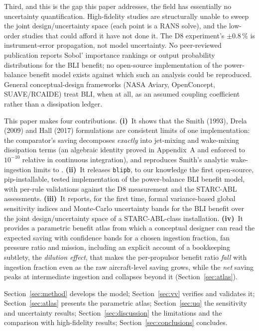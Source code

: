 \documentclass[10pt]{article}
\begin{document}
Third, and this is the gap this paper addresses, the field has
essentially no uncertainty quantification. High-fidelity studies
\citep{yildirim2022, gray2018} are structurally unable to sweep the joint
design/uncertainty space (each point is a RANS solve), and the low-order
studies that could afford it have not done it. The D8 experiment's
$\pm0.8$\,\% is instrument-error propagation, not model uncertainty. No
peer-reviewed publication reports Sobol' importance rankings or output
probability distributions for the BLI benefit; no open-source implementation
of the power-balance benefit model exists against which such an analysis
could be reproduced. General conceptual-design frameworks (NASA Aviary,
OpenConcept, SUAVE/RCAIDE) treat BLI, when at all, as an assumed coupling
coefficient rather than a dissipation ledger.

This paper makes four contributions. \textbf{(i)}~It shows that the Smith
(1993), Drela (2009) and Hall (2017) formulations are consistent limits of
one implementation: the comparator's saving decomposes \emph{exactly} into
jet-mixing and wake-mixing dissipation terms (an algebraic identity proved
in Appendix~A and enforced to $10^{-10}$ relative in continuous
integration), and reproduces Smith's analytic wake-ingestion limits to
\numSmithErr. \textbf{(ii)}~It releases \texttt{blipb}, to our knowledge the
first open-source, pip-installable, tested implementation of the
power-balance BLI benefit model, with per-rule validations against the D8
measurement and the STARC-ABL assessments. \textbf{(iii)}~It reports, for
the first time, formal variance-based global sensitivity indices and
Monte-Carlo uncertainty bands for the BLI benefit over the joint
design/uncertainty space of a STARC-ABL-class installation.
\textbf{(iv)}~It provides a parametric benefit atlas from which a conceptual
designer can read the expected saving with confidence bands for a chosen
ingestion fraction, fan pressure ratio and mission, including an explicit
account of a bookkeeping subtlety, the \emph{dilution effect}, that
makes the per-propulsor benefit ratio \emph{fall} with ingestion fraction
even as the raw aircraft-level saving grows, while the \emph{net} saving
peaks at intermediate ingestion and collapses beyond it
(Section~\ref{sec:atlas}).

Section~\ref{sec:method} develops the model; Section~\ref{sec:vv} verifies
and validates it; Section~\ref{sec:atlas} presents the parametric atlas;
Section~\ref{sec:uq} the sensitivity and uncertainty results;
Section~\ref{sec:discussion} the limitations and the comparison with
high-fidelity results; Section~\ref{sec:conclusions} concludes.
\end{document}
